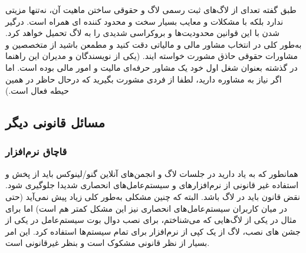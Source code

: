 طبق گفته تعدای از لاگ‌های ثبت رسمی لاگ و حقوقی ساختن ماهیت آن، نه‌تنها مزیتی ندارد بلکه با مشکلات
و معایب بسیار سخت و محدود کننده ای همراه است. درگیر شدن با این قوانین محدودیت‌ها و بروکراسی
شدیدی را به لاگ تحمیل خواهد کرد. به‌طور کلی در انتخاب مشاور مالی و مالیاتی دقت کنید و مطمعن باشید
از متخصصین و مشاورات حقوقی حاذق مشورت خواسته ایند. (یکی از نویسندگان و مدیران این راهنما در گذشته
بعنوان شغل اول خود یک مشاور حرفه‌ای مالیت و امور مالی بوده است. اما اگر نیاز به مشاوره دارید، لطفا
از فردی مشورت بگیرید که درحال حاظر در همین حیطه فعال است.)

\subsection{مسائل قانونی دیگر}

\subsubsection{قاچاق نرم‌افزار}
همانطور که به یاد دارید در جلسات لاگ و انجمن‌های آنلاین گنو/لینوکس باید از پخش و استفاده غیر قانونی
از نرم‌افزارهای و سیستم‌عامل‌های انحصاری شدیدا جلوگیری شود. نقض قانون باید در لاگ
باشد. البته که چنین مشکلی به‌طور کلی زیاد پیش نمی‌آید (حتی در میان کاربران سیستم‌عامل‌های انحصاری
نیز این مشکل کمتر هم است) اما برای مثال در یکی از لاگ‌هایی که می‌شناختم، برای نصب دوال بوت سیستم‌عامل
در یکی از جشن های نصب، لاگ از یک کپی از نرم‌افزار 
برای تمام سیستم‌ها استفاده کرد. این امر بسیار از نظر قانونی مشکوک است و بنظر غیرقانونی است.

